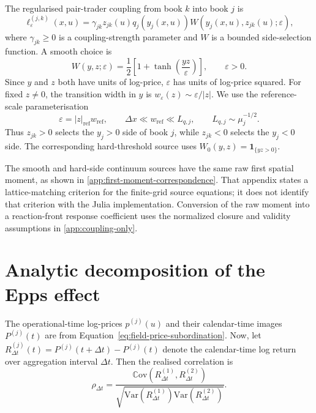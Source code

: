 \documentclass[5p,final]{elsarticle}
\newcommand{\Var}{\mbox{Var}}
\newcommand{\Cov}{\mathbb{C}\mathrm{ov}}
\begin{document}
The regularised pair-trader coupling from book $k$ into book $j$ is
\begin{equation}
    \ell_\varepsilon^{(j,k)}(x,u)
    =\gamma_{jk}z_{jk}(u)q_j\!\left(y_j(x,u)\right)
      W\!\left(y_j(x,u),z_{jk}(u);\varepsilon\right),
    \label{eq:regularised-coupling}
\end{equation}
where $\gamma_{jk}\geq0$ is a coupling-strength parameter and $W$ is a bounded side-selection function. A smooth choice \cite{OlssonKreiss2005,XiaoHonmaKono2005} is
\begin{equation}
    W(y,z;\varepsilon)
    =\frac{1}{2}\left[1+\tanh\!\left(\frac{yz}{\varepsilon}\right)\right],
    \qquad \varepsilon>0.
    \label{eq:side-selection-function}
\end{equation}
Since $y$ and $z$ both have units of log-price, $\varepsilon$ has units of log-price squared. For fixed $z\ne0$, the transition width in $y$ is $w_\varepsilon(z)\sim\varepsilon/|z|$. We use the reference-scale parameterisation
\begin{equation}
    \varepsilon=|z|_{\mathrm{ref}}w_{\mathrm{ref}},
    \qquad
    \Delta x\ll w_{\mathrm{ref}}\ll L_{q,j},
    \qquad
    L_{q,j}\sim\mu_j^{-1/2}.
\end{equation}
Thus $z_{jk}>0$ selects the $y_j>0$ side of book $j$, while $z_{jk}<0$ selects the $y_j<0$ side. The corresponding hard-threshold source uses $W_0(y,z)=\mathbf{1}_{\{yz>0\}}$.

The smooth and hard-side continuum sources have the same raw first spatial moment, as shown in \ref{app:first-moment-correspondence}. That appendix states a lattice-matching criterion for the finite-grid source equations; it does not identify that criterion with the Julia implementation. Conversion of the raw moment into a reaction-front response coefficient uses the normalized closure and validity assumptions in \ref{app:coupling-only}.

\section{Analytic decomposition of the Epps effect}

The operational-time log-prices $p^{(j)}(u)$ and their calendar-time images $P^{(j)}(t)$ are from Equation~\eqref{eq:field-price-subordination}. Now, let $R^{(j)}_{\Delta t}(t)=P^{(j)}(t+\Delta t)-P^{(j)}(t)$ denote the calendar-time log return over aggregation interval $\Delta t$.
Then the realised correlation \cite{BarndorffNielsenShephard2004RealizedCovariation} is
\begin{equation}
 \rho_{\Delta t}=\frac{\Cov(R^{(1)}_{\Delta t},R^{(2)}_{\Delta t})}{
 \sqrt{\Var(R^{(1)}_{\Delta t})\Var(R^{(2)}_{\Delta t})}}. \label{eq:realised-corr}
\end{equation}
\end{document}
